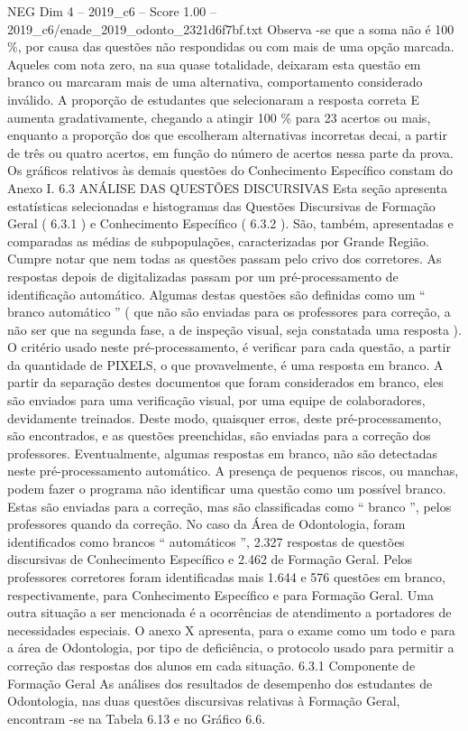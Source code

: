 \begin{textsample}{NEG Dim 4 – 2019\_c6 – Score 1.00 – 2019\_c6/enade\_2019\_odonto\_2321d6f7bf.txt}
Observa -se que a soma não é 100 \%, por causa das questões não respondidas ou com mais de uma opção marcada.
Aqueles com nota zero, na sua quase totalidade, deixaram esta questão em branco ou marcaram mais de uma alternativa, comportamento considerado inválido.
A proporção de estudantes que selecionaram a resposta correta E aumenta gradativamente, chegando a atingir 100 \% para 23 acertos ou mais, enquanto a proporção dos que escolheram alternativas incorretas decai, a partir de três ou quatro acertos, em função do número de acertos nessa parte da prova.
Os gráficos relativos às demais questões do Conhecimento Específico constam do Anexo I. 6.3 ANÁLISE DAS QUESTÕES DISCURSIVAS Esta seção apresenta estatísticas selecionadas e histogramas das Questões Discursivas de Formação Geral ( 6.3.1 ) e Conhecimento Específico ( 6.3.2 ).
São, também, apresentadas e comparadas as médias de subpopulações, caracterizadas por Grande Região.
Cumpre notar que nem todas as questões passam pelo crivo dos corretores.
As respostas depois de digitalizadas passam por um pré-processamento de identificação automático.
Algumas destas questões são definidas como um “ branco automático ” ( que não são enviadas para os professores para correção, a não ser que na segunda fase, a de inspeção visual, seja constatada uma resposta ).
O critério usado neste pré-processamento, é verificar para cada questão, a partir da quantidade de PIXELS, o que provavelmente, é uma resposta em branco.
A partir da separação destes documentos que foram considerados em branco, eles são enviados para uma verificação visual, por uma equipe de colaboradores, devidamente treinados.
Deste modo, quaisquer erros, deste pré-processamento, são encontrados, e as questões preenchidas, são enviadas para a correção dos professores.
Eventualmente, algumas respostas em branco, não são detectadas neste pré-processamento automático.
A presença de pequenos riscos, ou manchas, podem fazer o programa não identificar uma questão como um possível branco.
Estas são enviadas para a correção, mas são classificadas como “ branco ”, pelos professores quando da correção.
No caso da Área de Odontologia, foram identificados como brancos “ automáticos ”, 2.327 respostas de questões discursivas de Conhecimento Específico e 2.462 de Formação Geral.
Pelos professores corretores foram identificadas mais 1.644 e 576 questões em branco, respectivamente, para Conhecimento Específico e para Formação Geral.
Uma outra situação a ser mencionada é a ocorrências de atendimento a portadores de necessidades especiais.
O anexo X apresenta, para o exame como um todo e para a área de Odontologia, por tipo de deficiência, o protocolo usado para permitir a correção das respostas dos alunos em cada situação. 6.3.1 Componente de Formação Geral As análises dos resultados de desempenho dos estudantes de Odontologia, nas duas questões discursivas relativas à Formação Geral, encontram -se na Tabela 6.13 e no Gráfico 6.6.

\end{textsample}
